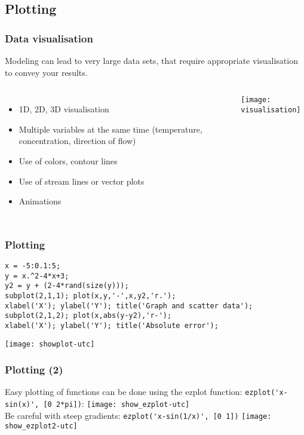 \documentclass[11pt,table,final,fleqn,xcolor={usenames,dvipsnames},unknownkeysallowed]{beamer}
\begin{document}
\subsection*{Plotting}
\begin{frame}
 \frametitle{Data visualisation}
 Modeling can lead to very large data sets, that require appropriate visualisation to convey your results.
 \begin{columns}
    \begin{itemize}
      \item 1D, 2D, 3D visualisation
      \item Multiple variables at the same time (temperature, concentration, direction of flow)
      \item Use of colors, contour lines
      \item Use of stream lines or vector plots
      \item Animations
    \end{itemize}
   \centering\texttt{[image: visualisation]}
 \end{columns}
\end{frame}

\begin{frame}[fragile]
  \frametitle{Plotting}
  \begin{lstlisting}
x = -5:0.1:5;
y = x.^2-4*x+3;
y2 = y + (2-4*rand(size(y)));
subplot(2,1,1); plot(x,y,'-',x,y2,'r.');
xlabel('X'); ylabel('Y'); title('Graph and scatter data');
subplot(2,1,2); plot(x,abs(y-y2),'r-');
xlabel('X'); ylabel('Y'); title('Absolute error');
  \end{lstlisting}
  \centering\texttt{[image: showplot-utc]}
\end{frame}

\begin{frame}[fragile]
  \frametitle{Plotting (2)}
  Easy plotting of functions can be done using the ezplot function: \lstinline$ezplot('x-sin(x)', [0 2*pi])$:
  \texttt{[image: show\_ezplot-utc]}\\
  Be careful with steep gradients: \lstinline$ezplot('x-sin(1/x)', [0 1])$%
  \texttt{[image: show\_ezplot2-utc]}
\end{frame}
\end{document}
